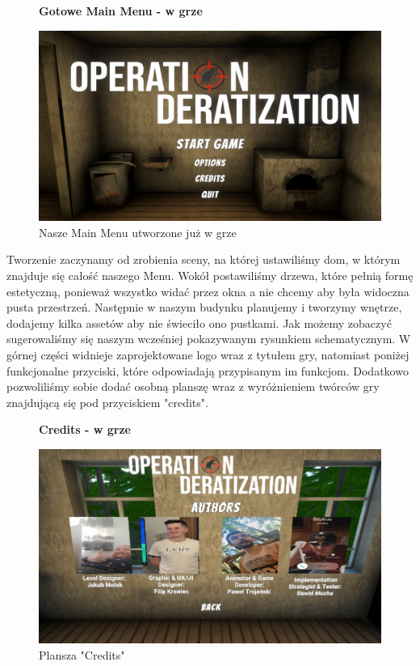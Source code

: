 \begin{figure}[h]
\begin{center}
{\bfseries Gotowe Main Menu - w grze}
\end{center}
    \centering
    \includegraphics[width=0.75\linewidth]{Images/mainMenuInGame.jpg}
    \caption{Nasze Main Menu utworzone już w grze}
\end{figure}
\FloatBarrier

Tworzenie zaczynamy od zrobienia sceny, na której ustawiliśmy dom, w którym znajduje się całość naszego Menu. Wokół postawiliśmy drzewa, które pełnią formę estetyczną, ponieważ wszystko widać przez okna a nie chcemy aby była widoczna pusta przestrzeń. Następnie w naszym budynku planujemy i tworzymy wnętrze, dodajemy kilka assetów aby nie świeciło ono pustkami. Jak możemy zobaczyć sugerowaliśmy się naszym wcześniej pokazywanym rysunkiem schematycznym. W górnej części widnieje zaprojektowane logo wraz z tytułem gry, natomiast poniżej funkcjonalne przyciski, które odpowiadają przypisanym im funkcjom. Dodatkowo pozwoliliśmy sobie dodać osobną planszę wraz z wyróżnieniem twórców gry znajdującą się pod przyciskiem "credits".\\

\begin{figure}[h]
\begin{center}
{\bfseries Credits - w grze}
\end{center}
    \centering
    \includegraphics[width=0.75\linewidth]{Images/CreditsInGame.jpg}
    \caption{Plansza "Credits"}
\end{figure}

